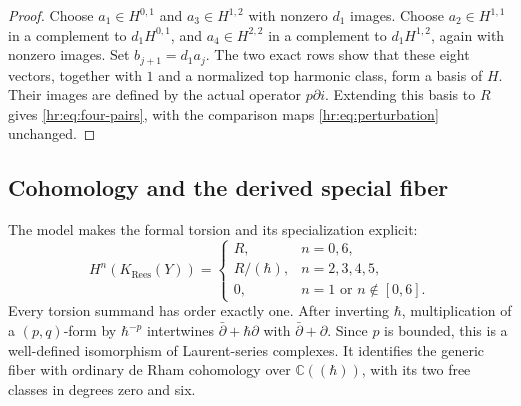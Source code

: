 \begin{proof}
Choose $a_1\in H^{0,1}$ and $a_3\in H^{1,2}$ with
nonzero $d_1$ images. Choose $a_2\in H^{1,1}$ in a
complement to $d_1H^{0,1}$, and $a_4\in H^{2,2}$
in a complement to $d_1H^{1,2}$, again with nonzero
images. Set $b_{j+1}=d_1a_j$.
The two exact rows show that these eight vectors,
together with $1$ and a normalized top harmonic
class, form a basis of $H$.
Their images are defined by the actual operator
$p\partial i$. Extending this basis to $R$ gives
\eqref{hr:eq:four-pairs}, with the comparison maps
\eqref{hr:eq:perturbation} unchanged.
\end{proof}

\subsection{Cohomology and the derived special fiber}

The model makes the formal torsion and its specialization
explicit:
\begin{equation}\label{hr:eq:Rees-cohomology}
 H^n(K_{\mathrm{Rees}}(Y))=
 \begin{cases}
 R,&n=0,6,\\
 R/(\hbar),&n=2,3,4,5,\\
 0,&n=1\text{ or }n\notin[0,6].
 \end{cases}
\end{equation}
Every torsion summand has order exactly one.
After inverting $\hbar$, multiplication of a
$(p,q)$-form by $\hbar^{-p}$ intertwines
$\bar\partial+\hbar\partial$ with
$\bar\partial+\partial$. Since $p$ is bounded, this
is a well-defined isomorphism of Laurent-series
complexes. It identifies the generic fiber with
ordinary de Rham cohomology over $\mathbb C((\hbar))$,
with its two free classes in degrees zero and six.

